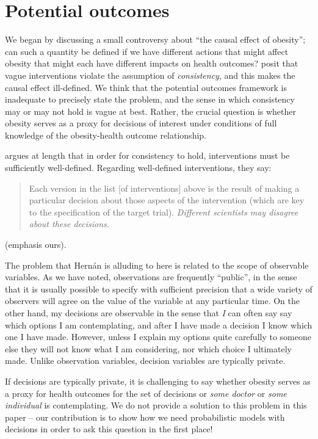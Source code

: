 

\section{Potential outcomes}\label{sec:potential_outcomes}

We began by discussing a small controversy about ``the causal effect of obesity''; can such a quantity be defined if we have different actions that might affect obesity that might each have different impacts on health outcomes? \citet{hernan_does_2008} posit that vague interventions violate the assumption of \emph{consistency}, and this makes the causal effect ill-defined. We think that the potential outcomes framework is inadequate to precisely state the problem, and the sense in which consistency may or may not hold is vague at best. Rather, the crucial question is whether obesity serves as a proxy for decisions of interest under conditions of full knowledge of the obesity-health outcome relationship.

\citet{noauthor_does_2016} argues at length that in order for consistency to hold, interventions must be sufficiently well-defined. Regarding well-defined interventions, they say:
\begin{quote}
Each version in the list [of interventions] above is the result of making a particular decision about those aspects of the intervention (which are key to the specification of the target trial). \emph{Different scientists may disagree about these decisions.}
\end{quote}
(emphasis ours).

The problem that Hern\'an is alluding to here is related to the scope of observable variables. As we have noted, observations are frequently ``public'', in the sense that it is usually possible to specify with sufficient precision that a wide variety of observers will agree on the value of the variable at any particular time. On the other hand, my decisions are observable in the sense that \emph{I} can often say say which options I am contemplating, and after I have made a decision I know which one I have made. However, unless I explain my options quite carefully to someone else they will not know what I am considering, nor which choice I ultimately made. Unlike observation variables, decision variables are typically private.

If decisions are typically private, it is challenging to say whether obesity serves as a proxy for health outcomes for the set of decisions  or \emph{some doctor} or \emph{some individual} is contemplating. We do not provide a solution to this problem in this paper -- our contribution is to show how we need probabilistic models with decisions in order to ask this question in the first place!

